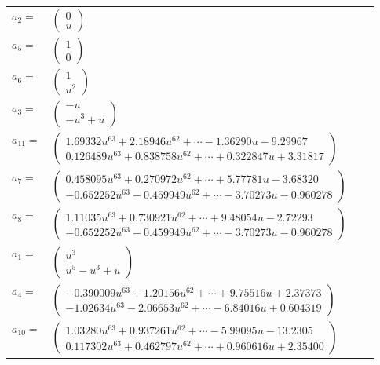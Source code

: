 \documentclass[1p]{elsarticle_modified}
\theoremstyle{definition}
\begin{document}
\begin{tabular}{m{7pt} m{180pt} m{7pt} m{180pt} }
\flushright $a_{2}=$&$\begin{pmatrix}0\\u\end{pmatrix}$ \\
\flushright $a_{5}=$&$\begin{pmatrix}1\\0\end{pmatrix}$ \\
\flushright $a_{6}=$&$\begin{pmatrix}1\\u^2\end{pmatrix}$ \\
\flushright $a_{3}=$&$\begin{pmatrix}- u\\- u^3+u\end{pmatrix}$ \\
\flushright $a_{11}=$&$\begin{pmatrix}1.69332 u^{63}+2.18946 u^{62}+\cdots-1.36290 u-9.29967\\0.126489 u^{63}+0.838758 u^{62}+\cdots+0.322847 u+3.31817\end{pmatrix}$ \\
\flushright $a_{7}=$&$\begin{pmatrix}0.458095 u^{63}+0.270972 u^{62}+\cdots+5.77781 u-3.68320\\-0.652252 u^{63}-0.459949 u^{62}+\cdots-3.70273 u-0.960278\end{pmatrix}$ \\
\flushright $a_{8}=$&$\begin{pmatrix}1.11035 u^{63}+0.730921 u^{62}+\cdots+9.48054 u-2.72293\\-0.652252 u^{63}-0.459949 u^{62}+\cdots-3.70273 u-0.960278\end{pmatrix}$ \\
\flushright $a_{1}=$&$\begin{pmatrix}u^3\\u^5- u^3+u\end{pmatrix}$ \\
\flushright $a_{4}=$&$\begin{pmatrix}-0.390009 u^{63}+1.20156 u^{62}+\cdots+9.75516 u+2.37373\\-1.02634 u^{63}-2.06653 u^{62}+\cdots-6.84016 u+0.604319\end{pmatrix}$ \\
\flushright $a_{10}=$&$\begin{pmatrix}1.03280 u^{63}+0.937261 u^{62}+\cdots-5.99095 u-13.2305\\0.117302 u^{63}+0.462797 u^{62}+\cdots+0.960616 u+2.35400\end{pmatrix}$ \\

\end{tabular}
\end{document}
